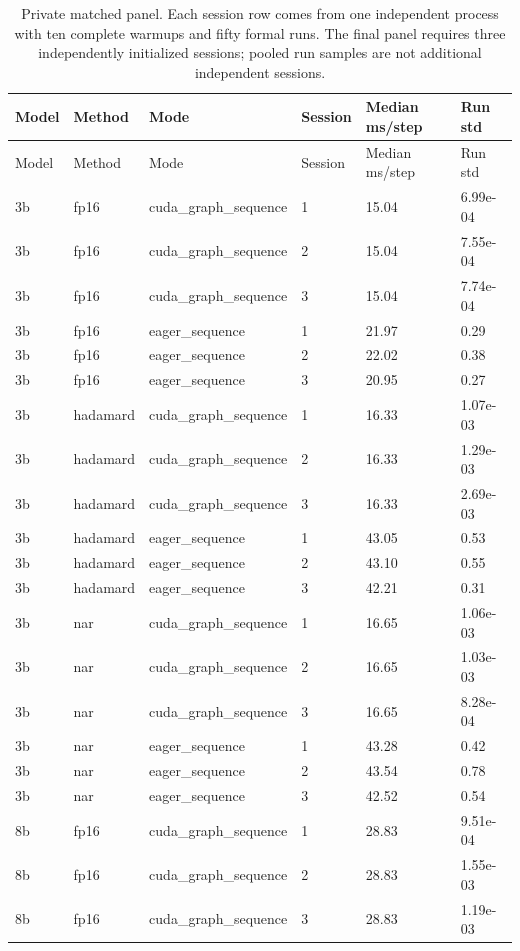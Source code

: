 {\small
\begin{longtable}{llllll}
\caption{Private matched panel. Each session row comes from one independent process with ten complete warmups and fifty formal runs. The final panel requires three independently initialized sessions; pooled run samples are not additional independent sessions.} \\
\toprule
Model & Method & Mode & Session & Median ms/step & Run std \\
\midrule
\endfirsthead
\toprule
Model & Method & Mode & Session & Median ms/step & Run std \\
\midrule
\endhead
3b & fp16 & cuda\_graph\_sequence & 1 & 15.04 & 6.99e-04 \\
3b & fp16 & cuda\_graph\_sequence & 2 & 15.04 & 7.55e-04 \\
3b & fp16 & cuda\_graph\_sequence & 3 & 15.04 & 7.74e-04 \\
3b & fp16 & eager\_sequence & 1 & 21.97 & 0.29 \\
3b & fp16 & eager\_sequence & 2 & 22.02 & 0.38 \\
3b & fp16 & eager\_sequence & 3 & 20.95 & 0.27 \\
3b & hadamard & cuda\_graph\_sequence & 1 & 16.33 & 1.07e-03 \\
3b & hadamard & cuda\_graph\_sequence & 2 & 16.33 & 1.29e-03 \\
3b & hadamard & cuda\_graph\_sequence & 3 & 16.33 & 2.69e-03 \\
3b & hadamard & eager\_sequence & 1 & 43.05 & 0.53 \\
3b & hadamard & eager\_sequence & 2 & 43.10 & 0.55 \\
3b & hadamard & eager\_sequence & 3 & 42.21 & 0.31 \\
3b & nar & cuda\_graph\_sequence & 1 & 16.65 & 1.06e-03 \\
3b & nar & cuda\_graph\_sequence & 2 & 16.65 & 1.03e-03 \\
3b & nar & cuda\_graph\_sequence & 3 & 16.65 & 8.28e-04 \\
3b & nar & eager\_sequence & 1 & 43.28 & 0.42 \\
3b & nar & eager\_sequence & 2 & 43.54 & 0.78 \\
3b & nar & eager\_sequence & 3 & 42.52 & 0.54 \\
8b & fp16 & cuda\_graph\_sequence & 1 & 28.83 & 9.51e-04 \\
8b & fp16 & cuda\_graph\_sequence & 2 & 28.83 & 1.55e-03 \\
8b & fp16 & cuda\_graph\_sequence & 3 & 28.83 & 1.19e-03 \\

\end{longtable}}
